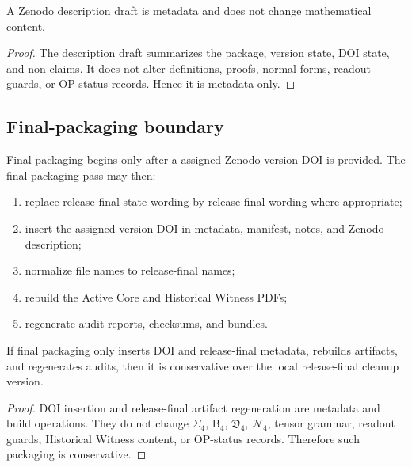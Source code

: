 \begin{lemma}
\label{lem:v4014-description-draft-is-metadata}
A Zenodo description draft is metadata and does not change mathematical content.
\end{lemma}

\begin{proof}
The description draft summarizes the package, version state, DOI state, and
non-claims. It does not alter definitions, proofs, normal forms, readout
guards, or OP-status records. Hence it is metadata only.
\end{proof}

\subsection{Final-packaging boundary}
\label{subsec:v4014-final-packaging-boundary}

\begin{definition}
\label{def:v4014-final-packaging-boundary}
Final packaging begins only after a assigned Zenodo version DOI is provided. The
final-packaging pass may then:
\begin{enumerate}[leftmargin=*]
 \item replace release-final state wording by release-final wording where appropriate;
 \item insert the assigned version DOI in metadata, manifest, notes, and Zenodo
 description;
 \item normalize file names to release-final names;
 \item rebuild the Active Core and Historical Witness PDFs;
 \item regenerate audit reports, checksums, and bundles.
\end{enumerate}
\end{definition}

\begin{proposition}
\label{prop:v4014-final-packaging-conservative-when-doi-only}
If final packaging only inserts DOI and release-final metadata, rebuilds
artifacts, and regenerates audits, then it is conservative over the local
release-final cleanup version.
\end{proposition}

\begin{proof}
DOI insertion and release-final artifact regeneration are metadata and build
operations. They do not change $\Sigma_4$, $\mathrm B_4$, $\mathfrak D_4$,
$\mathcal N_4$, tensor grammar, readout guards, Historical Witness content, or
OP-status records. Therefore such packaging is conservative.
\end{proof}

